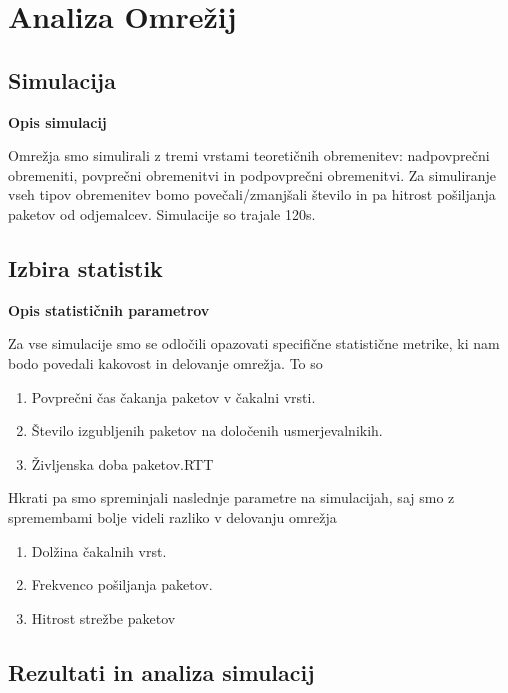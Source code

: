 \documentclass[a4paper,11pt]{article}
\begin{document}
\section{Analiza Omrežij} \par
\subsection{Simulacija} \par
\large \bf Opis simulacij \par
\normalfont \normalsize
Omrežja smo simulirali z tremi vrstami teoretičnih obremenitev: nadpovprečni obremeniti, povprečni obremenitvi in podpovprečni obremenitvi. Za simuliranje vseh tipov obremenitev bomo povečali/zmanjšali število in pa hitrost pošiljanja paketov od odjemalcev. Simulacije so trajale 120s.  

\subsection{Izbira statistik} \par
\large \bf Opis statističnih parametrov \par
\normalfont \normalsize
Za vse simulacije smo se odločili opazovati specifične statistične metrike, ki nam bodo povedali kakovost in delovanje omrežja. To so

\begin{enumerate}
	\item Povprečni čas čakanja paketov v čakalni vrsti.
	\item Število izgubljenih paketov na določenih usmerjevalnikih.
	\item Življenska doba paketov.RTT
\end{enumerate}

Hkrati pa smo spreminjali naslednje parametre na simulacijah, saj smo z spremembami bolje videli razliko v delovanju omrežja

\begin{enumerate}
	\item Dolžina čakalnih vrst.
	\item Frekvenco pošiljanja paketov.
	\item Hitrost strežbe paketov
\end{enumerate}


	
\subsection{Rezultati in analiza simulacij} \par
\end{document}
